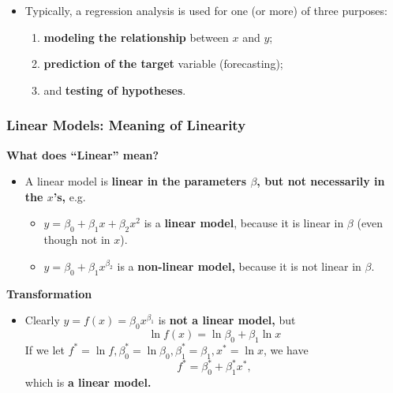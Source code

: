 \documentclass[10pt]{beamer} %
\begin{document}
\begin{frame}
	\begin{itemize}
		\item Typically, a regression analysis is used for one (or more) of three purposes:
			\vspace{0.5cm}
		
\begin{enumerate}
	\item \textbf{modeling the relationship} between $x$ and $y$;
	\vspace{0.5cm}
	
	\item \textbf{prediction of the target} variable (forecasting);
		\vspace{0.5cm}
	
	\item  and \textbf{testing of hypotheses}.
\end{enumerate}
\end{itemize}	
	
\end{frame}

\begin{frame}
\frametitle{Linear Models: Meaning of Linearity}%


\textbf{What does ``Linear'' mean?}
\begin{itemize}
	\item A linear model is \textbf{linear in the parameters $\beta$, but not necessarily in the $x$'s,} e.g.
	\bigskip
	\begin{itemize}
		\item[*] $y=\beta_0 + \beta_1x +\beta_2x^2$ is a \textbf{linear model}, because it is linear in $\beta$ (even though not in $x$).
		\bigskip
		\item[*] $y=\beta_0 + \beta_1x^{\beta_2}$ is a \textbf{non-linear model,} because it is not linear in $\beta$.
		
	\end{itemize}
\end{itemize}




\textbf{Transformation}
\begin{itemize}
	\item Clearly $y=f(x) = \beta_0x^{\beta_1}$ is \textbf{not a linear model,} but
	$$\ln f(x) = \ln \beta_0 + \beta_1\ln x$$
	If we let $f^* = \ln f , \beta_0^* = \ln \beta_0, \beta_1^* = \beta_1, x^* = \ln x$,
	we have
	$$f^* = \beta_0^* + \beta_1^*x^*,$$
	which is \textbf{a linear model.}

\end{itemize}






\end{frame}
\end{document}
